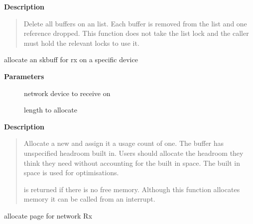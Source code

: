 \documentclass[a4paper,8pt,english]{sphinxmanual}
\begin{document}
\textbf{Description}
\begin{quote}

Delete all buffers on an {\hyperref[networking/kapi:c.sk_buff]{\emph{}}} list. Each buffer is removed from
the list and one reference dropped. This function does not take the
list lock and the caller must hold the relevant locks to use it.
\end{quote}

\begin{fulllineitems}
\label{networking/kapi:c.netdev_alloc_skb}
allocate an skbuff for rx on a specific device

\end{fulllineitems}


\textbf{Parameters}
\begin{description}
\item[{}] \leavevmode
network device to receive on

\item[{}] \leavevmode
length to allocate

\end{description}

\textbf{Description}
\begin{quote}

Allocate a new {\hyperref[networking/kapi:c.sk_buff]{\emph{}}} and assign it a usage count of one. The
buffer has unspecified headroom built in. Users should allocate
the headroom they think they need without accounting for the
built in space. The built in space is used for optimisations.

 is returned if there is no free memory. Although this function
allocates memory it can be called from an interrupt.
\end{quote}

\begin{fulllineitems}
\label{networking/kapi:c.__dev_alloc_pages}
allocate page for network Rx

\end{fulllineitems}
\end{document}
